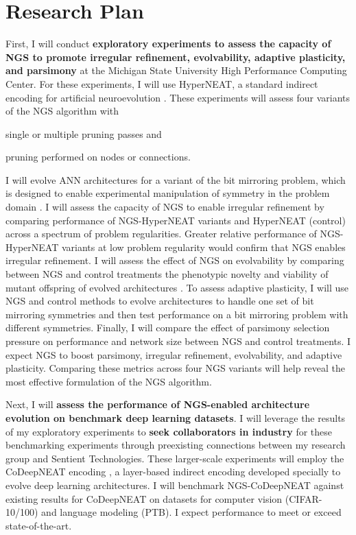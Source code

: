 \section{Research Plan}

First, I will conduct \textbf{exploratory experiments to assess the capacity of NGS to promote irregular refinement, evolvability, adaptive plasticity, and parsimony} at the Michigan State University High Performance Computing Center.
For these experiments, I will use HyperNEAT, a standard indirect encoding for artificial neuroevolution \cite{clune2011performance}.
These experiments will assess four variants of the NGS algorithm with
\begin{enumerate*}[label=(\alph*)]
\item single or multiple pruning passes and
\item pruning performed on nodes or connections.
\end{enumerate*}
I will evolve ANN architectures for a variant of the bit mirroring problem, which is designed to enable experimental manipulation of symmetry in the problem domain \cite{clune2011performance}.
I will assess the capacity of NGS to enable irregular refinement by comparing performance of NGS-HyperNEAT variants and HyperNEAT (control) across a spectrum of problem regularities.
Greater relative performance of NGS-HyperNEAT variants at low problem regularity would confirm that NGS enables irregular refinement.
I will assess the effect of NGS on evolvability by comparing between NGS and control treatments the phenotypic novelty and viability of mutant offspring of evolved architectures \cite{tarapore2015evolvability}.
To assess adaptive plasticity, I will use NGS and control methods to evolve architectures to handle one set of bit mirroring symmetries and then test performance on a bit mirroring problem with different symmetries.
Finally, I will compare the effect of parsimony selection pressure on performance and network size between NGS and control treatments.
I expect NGS to boost parsimony, irregular refinement, evolvability, and adaptive plasticity.
Comparing these metrics across four NGS variants will help reveal the most effective formulation of the NGS algorithm.

Next, I will \textbf{assess the performance of NGS-enabled architecture evolution on benchmark deep learning datasets}.
I will leverage the results of my exploratory experiments to \textbf{seek collaborators in industry} for these benchmarking experiments through preexisting connections between my research group and Sentient Technologies.
These larger-scale experiments will employ the CoDeepNEAT encoding \cite{miikkulainen2017evolving}, a layer-based indirect encoding developed specially to evolve deep learning architectures.
I will benchmark NGS-CoDeepNEAT against existing results for CoDeepNEAT on datasets for computer vision (CIFAR-10/100) and language modeling (PTB).
I expect performance to meet or exceed state-of-the-art.
